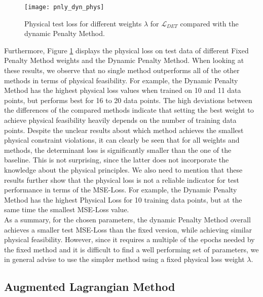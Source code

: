 \begin{figure}[H]
	\centering
	\texttt{[image: pnly\_dyn\_phys]}
	\caption{Physical test loss for different weights $\lambda$ for $\mathcal{L}_{DET}$ compared with the dynamic Penalty Method.}
	\label{fig:pnly_dyn_phys}
\end{figure}
\indent Furthermore, Figure \ref{fig:pnly_dyn_phys} displays the physical loss on test data of different Fixed Penalty Method weights and the Dynamic Penalty Method. When looking at these results, we observe that no single method outperforms all of the other methods in terms of physical feasibility. For example, the Dynamic Penalty Method has the highest physical loss values when trained on 10 and 11 data points, but performs best for 16 to 20 data points. The high deviations between the differences of the compared methods indicate that setting the best weight to achieve physical feasibility heavily depends on the number of training data points. Despite the unclear results about which method achieves the smallest physical constraint violations, it can clearly be seen that for all weights and methods, the determinant loss is significantly smaller than the one of the baseline. This is not surprising, since the latter does not incorporate the knowledge about the physical principles. We also need to mention that these results further show that the physical loss is not a reliable indicator for test performance in terms of the MSE-Loss. For example, the Dynamic Penalty Method has the highest Physical Loss for 10 training data points, but at the same time the smallest MSE-Loss value.\\
\indent As a summary, for the chosen parameters, the dynamic Penalty Method overall achieves a smaller test MSE-Loss than the fixed version, while achieving similar physical feasibility. However, since it requires a multiple of the epochs needed by the fixed method and it is difficult to find a well performing set of parameters, we in general advise to use the simpler method using a fixed physical loss weight $\lambda$.

\subsection{Augmented Lagrangian Method}

